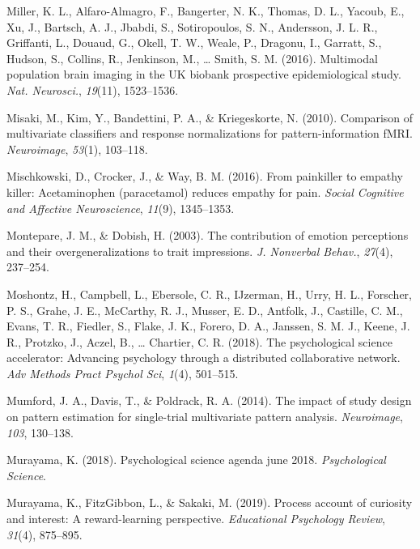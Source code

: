 \documentclass[11pt,american,a4paper,oneside,]{memoir} %
\begin{document}
\leavevmode\hypertarget{ref-Miller2016-oi}{}%
Miller, K. L., Alfaro-Almagro, F., Bangerter, N. K., Thomas, D. L., Yacoub, E., Xu, J., Bartsch, A. J., Jbabdi, S., Sotiropoulos, S. N., Andersson, J. L. R., Griffanti, L., Douaud, G., Okell, T. W., Weale, P., Dragonu, I., Garratt, S., Hudson, S., Collins, R., Jenkinson, M., \ldots{} Smith, S. M. (2016). Multimodal population brain imaging in the UK biobank prospective epidemiological study. \emph{Nat. Neurosci.}, \emph{19}(11), 1523--1536.

\leavevmode\hypertarget{ref-misaki2010comparison}{}%
Misaki, M., Kim, Y., Bandettini, P. A., \& Kriegeskorte, N. (2010). Comparison of multivariate classifiers and response normalizations for pattern-information fMRI. \emph{Neuroimage}, \emph{53}(1), 103--118.

\leavevmode\hypertarget{ref-mischkowski2016painkiller}{}%
Mischkowski, D., Crocker, J., \& Way, B. M. (2016). From painkiller to empathy killer: Acetaminophen (paracetamol) reduces empathy for pain. \emph{Social Cognitive and Affective Neuroscience}, \emph{11}(9), 1345--1353.

\leavevmode\hypertarget{ref-Montepare2003-hy}{}%
Montepare, J. M., \& Dobish, H. (2003). The contribution of emotion perceptions and their overgeneralizations to trait impressions. \emph{J. Nonverbal Behav.}, \emph{27}(4), 237--254.

\leavevmode\hypertarget{ref-Moshontz2018-rc}{}%
Moshontz, H., Campbell, L., Ebersole, C. R., IJzerman, H., Urry, H. L., Forscher, P. S., Grahe, J. E., McCarthy, R. J., Musser, E. D., Antfolk, J., Castille, C. M., Evans, T. R., Fiedler, S., Flake, J. K., Forero, D. A., Janssen, S. M. J., Keene, J. R., Protzko, J., Aczel, B., \ldots{} Chartier, C. R. (2018). The psychological science accelerator: Advancing psychology through a distributed collaborative network. \emph{Adv Methods Pract Psychol Sci}, \emph{1}(4), 501--515.

\leavevmode\hypertarget{ref-mumford2014impact}{}%
Mumford, J. A., Davis, T., \& Poldrack, R. A. (2014). The impact of study design on pattern estimation for single-trial multivariate pattern analysis. \emph{Neuroimage}, \emph{103}, 130--138.

\leavevmode\hypertarget{ref-murayama2018psychological}{}%
Murayama, K. (2018). Psychological science agenda\textbar{} june 2018. \emph{Psychological Science}.

\leavevmode\hypertarget{ref-murayama2019process}{}%
Murayama, K., FitzGibbon, L., \& Sakaki, M. (2019). Process account of curiosity and interest: A reward-learning perspective. \emph{Educational Psychology Review}, \emph{31}(4), 875--895.
\end{document}
